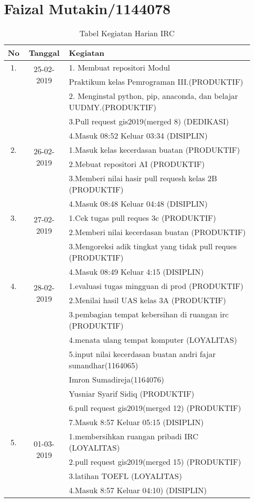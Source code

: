 \chapter{Faizal Mutakin/1144078}
\begin{table}[h]
\caption{Tabel Kegiatan Harian IRC}
\centering
\begin{tabular}{|c|c|l|}
\hline
No&Tanggal&Kegiatan\\
\hline
1.&\multirow{2}{*}{25-02-2019}&1. Membuat repositori Modul\\
&&Praktikum kelas Pemrograman III.(PRODUKTIF)\\
&&2. Menginstal python, pip, anaconda, dan belajar UUDMY.(PRODUKTIF)\\
&&3.Pull request gis2019(merged 8) (DEDIKASI)\\
&&4.Masuk 08:52 Keluar 03:34 (DISIPLIN)\\
\hline
2.&\multirow{2}{*}{26-02-2019}&1.Masuk kelas kecerdasan buatan (PRODUKTIF)\\
&&2.Mebuat repositori AI (PRODUKTIF)\\
&&3.Memberi nilai hasir pull requesh kelas 2B (PRODUKTIF)\\
&&4.Masuk 08:48 Keluar 04:48 (DISIPLIN)\\
\hline
3.&\multirow{2}{*}{27-02-2019}&1.Cek tugas pull reques 3c (PRODUKTIF)\\
&&2.Memberi nilai kecerdasan buatan (PRODUKTIF)\\
&&3.Mengoreksi adik tingkat yang tidak pull reques (PRODUKTIF)\\
&&4.Masuk 08:49 Keluar 4:15 (DISIPLIN)\\
\hline
4.&\multirow{2}{*}{28-02-2019}&1.evaluasi tugas mingguan di prod (PRODUKTIF)\\
&&2.Menilai hasil UAS kelas 3A (PRODUKTIF)\\
&&3.pembagian tempat kebersihan di ruangan irc (PRODUKTIF)\\
&&4.menata ulang tempat komputer (LOYALITAS)\\
&&5.input nilai kecerdasan buatan andri fajar sunandhar(1164065)\\
&&Imron Sumadireja(1164076)\\
&&Yusniar Syarif Sidiq (PRODUKTIF)\\
&&6.pull request gis2019(merged 12) (PRODUKTIF)\\
&&7.Masuk 8:57 Keluar 05:15 (DISIPLIN)\\
\hline
5.&\multirow{2}{*}{01-03-2019}&1.membersihkan ruangan pribadi IRC (LOYALITAS)\\
&&2.pull request gis2019(merged 15) (PRODUKTIF)\\
&&3.latihan TOEFL (LOYALITAS)\\
&&4.Masuk 8:57 Keluar 04:10) (DISIPLIN)\\
\hline
\end{tabular}
\label{table:contoh}
\end{table}
 
